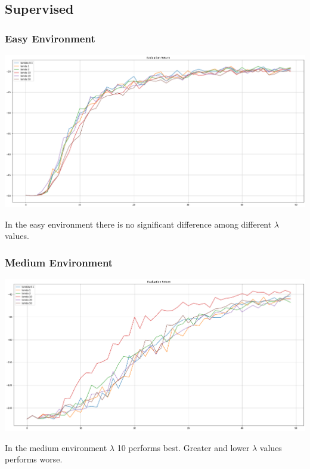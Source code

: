 \documentclass[11pt]{article}
\begin{document}
    \subsection{Supervised}

    \subsubsection{Easy Environment}

    \hspace*{-0.3in}
    \includegraphics[scale=0.30]{q4/eval-easy-supervised}

    In the easy environment there is no significant difference among different $\lambda$ values.

    \subsubsection{Medium Environment}

    \hspace*{-0.3in}
    \includegraphics[scale=0.30]{q4/eval-medium-supervised}

    In the medium environment $ \lambda $ 10 performs best.
    Greater and lower $\lambda$ values performs worse.
\end{document}
